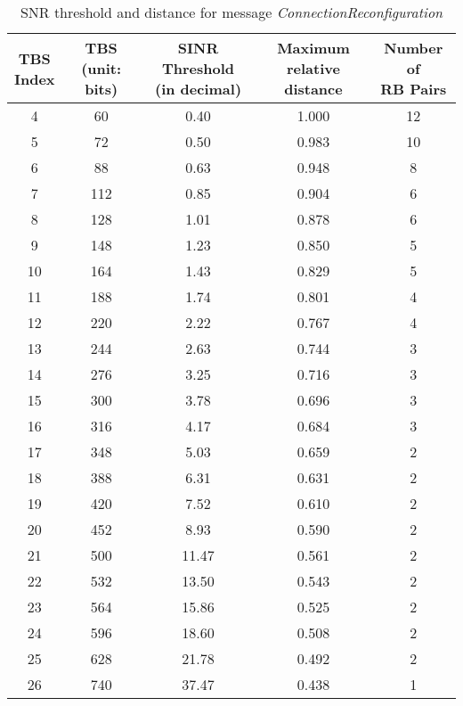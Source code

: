\begin{table}
	\centering
	\caption{SNR threshold and distance for message \emph{ConnectionReconfiguration}}
	\label{tab:tbs-distance}
	\begin{tabular}{ccccc}
		\toprule
		\thead{TBS\\Index} &  \thead{TBS \\ (unit: bits)} & \thead{SINR Threshold \\(in decimal) }& \thead{Maximum \\ relative distance}&  \thead{Number of \\RB Pairs} \\
		\midrule
		    4 &   60 &           0.40 &     1.000 &     12 \\
			5 &   72 &           0.50 &     0.983 &     10 \\
			6 &   88 &           0.63 &     0.948 &      8 \\
			7 &  112 &           0.85 &     0.904 &      6 \\
			8 &  128 &           1.01 &     0.878 &      6 \\
			9 &  148 &           1.23 &     0.850 &      5 \\
			10 &  164 &           1.43 &     0.829 &      5 \\
			11 &  188 &           1.74 &     0.801 &      4 \\
			12 &  220 &           2.22 &     0.767 &      4 \\
			13 &  244 &           2.63 &     0.744 &      3 \\
			14 &  276 &           3.25 &     0.716 &      3 \\
			15 &  300 &           3.78 &     0.696 &      3 \\
			16 &  316 &           4.17 &     0.684 &      3 \\
			17 &  348 &           5.03 &     0.659 &      2 \\
			18 &  388 &           6.31 &     0.631 &      2 \\
			19 &  420 &           7.52 &     0.610 &      2 \\
			20 &  452 &           8.93 &     0.590 &      2 \\
			21 &  500 &          11.47 &     0.561 &      2 \\
			22 &  532 &          13.50 &     0.543 &      2 \\
			23 &  564 &          15.86 &     0.525 &      2 \\
			24 &  596 &          18.60 &     0.508 &      2 \\
			25 &  628 &          21.78 &     0.492 &      2 \\
			26 &  740 &          37.47 &     0.438 &      1 \\
		\bottomrule
	\end{tabular}
\end{table}